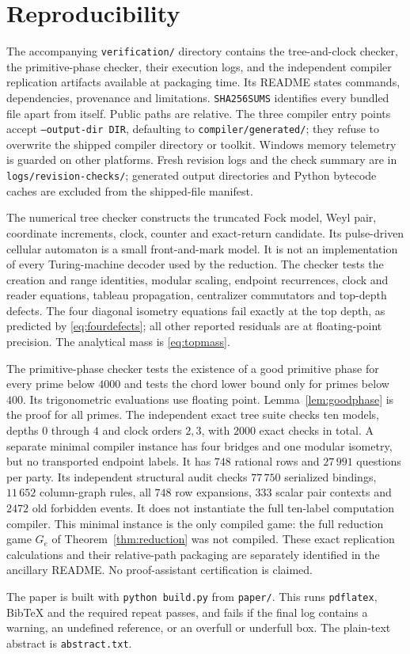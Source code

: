 \section{Reproducibility}\label{sec:repro}
The accompanying \texttt{verification/} directory contains the tree-and-clock checker, the primitive-phase checker, their execution logs, and the independent compiler replication artifacts available at packaging time. Its README states commands, dependencies, provenance and limitations. \texttt{SHA256SUMS} identifies every bundled file apart from itself. Public paths are relative. The three compiler entry points accept
\texttt{--output-dir DIR}, defaulting to \texttt{compiler/generated/};
they refuse to overwrite the shipped compiler directory or toolkit.
Windows memory telemetry is guarded on other platforms. Fresh revision
logs and the check summary are in \texttt{logs/revision-checks/}; generated
output directories and Python bytecode caches are excluded from the
shipped-file manifest.

The numerical tree checker constructs the truncated Fock model, Weyl pair, coordinate increments, clock, counter and exact-return candidate. Its pulse-driven cellular automaton is a small front-and-mark model. It is not an implementation of every Turing-machine decoder used by the reduction. The checker tests the creation and range identities, modular scaling, endpoint recurrences, clock and reader equations, tableau propagation, centralizer commutators and top-depth defects. The four diagonal isometry equations fail exactly at the top depth, as predicted by \eqref{eq:fourdefects}; all other reported residuals are at floating-point precision. The analytical mass is \eqref{eq:topmass}.

The primitive-phase checker tests the existence of a good primitive phase for every prime below $4000$ and tests the chord lower bound only for primes below $400$. Its trigonometric evaluations use floating point. Lemma~\ref{lem:goodphase} is the proof for all primes. The independent exact tree suite checks ten models, depths $0$ through $4$ and clock orders $2,3$, with $2000$ exact checks in total. A separate minimal compiler instance has four bridges and one modular isometry, but no transported endpoint labels. It has $748$ rational rows and $27\,991$ questions per party. Its independent structural audit checks $77\,750$ serialized bindings, $11\,652$ column-graph rules, all $748$ row expansions, $333$ scalar pair contexts and $2472$ old forbidden events. It does not instantiate the full ten-label computation compiler. This minimal instance is the only compiled game: the full reduction game $G_e$ of Theorem~\ref{thm:reduction} was not compiled. These exact replication calculations and their relative-path packaging are separately identified in the ancillary README. No proof-assistant certification is claimed.

The paper is built with \texttt{python build.py} from \texttt{paper/}. This runs \texttt{pdflatex}, BibTeX and the required repeat passes, and fails if the final log contains a warning, an undefined reference, or an overfull or underfull box. The plain-text abstract is \texttt{abstract.txt}.
